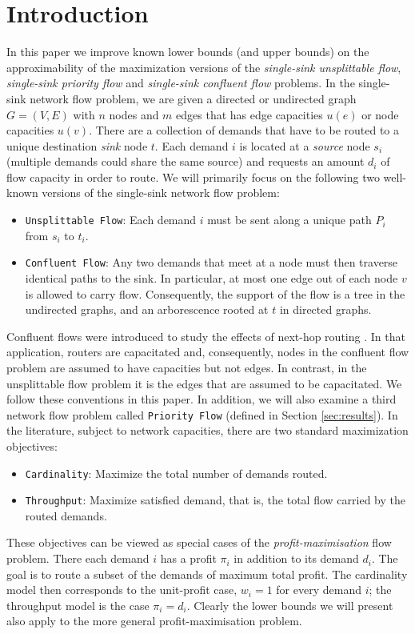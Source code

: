 \documentclass[12pt]{article}
\begin{document}
\section{Introduction}
In this paper we improve known lower bounds (and upper bounds) on the approximability
of the maximization versions of the {\em single-sink unsplittable flow}, {\em single-sink priority flow}
and {\em single-sink confluent flow} problems.
In the single-sink network flow problem, we are given
a directed or undirected graph $G=(V,E)$ with $n$ nodes and $m$ edges that has edge capacities $u(e)$ or
node capacities $u(v)$. There are a collection of demands
that have to be routed to a unique destination {\em sink} node $t$.
Each demand $i$ is located at a {\em source} node $s_i$ (multiple demands could share the same source)
and requests an amount $d_i$ of flow capacity in order to route.
We will primarily focus on the following two well-known versions of the single-sink network flow problem:
\begin{itemize}
\item {\tt Unsplittable Flow}: Each demand $i$ must be sent along a unique path $P_i$ from
$s_i$ to $t_i$.
\item {\tt Confluent Flow}: Any two demands that meet at a node must then traverse identical paths
to the sink.  In particular, at most one edge out of each node $v$ is allowed to carry flow.
Consequently, the support of the flow is a tree in the
undirected graphs, and an arborescence rooted at $t$ in directed graphs.
\end{itemize}
Confluent flows were introduced to study the effects of next-hop routing \cite{Chen05}.
In that application, routers are capacitated and, consequently, nodes
in the confluent flow problem are assumed to have capacities but not edges.
In contrast, in the unsplittable flow problem it is the edges that are assumed to
be capacitated. We follow these conventions in this paper.
In addition, we will also examine a third network flow problem called {\tt Priority Flow} (defined in Section \ref{sec:results}).
In the literature, subject to network capacities, there are two standard maximization objectives:



\begin{itemize}
\item {\tt Cardinality}: Maximize the total number of demands routed.
\item {\tt Throughput}: Maximize satisfied demand, that is, the total flow carried by the routed demands.
\end{itemize}
These objectives can be viewed as special cases of the
{\em profit-maximisation} flow problem. There each demand $i$ has
a profit $\pi_i$ in addition to its demand $d_i$. The goal is to route a subset
of the demands of maximum total profit. The cardinality model then corresponds to the
unit-profit case, $w_i=1$ for every demand $i$; the throughput model is the case $\pi_i=d_i$.
Clearly the lower bounds we will present also apply to the more general
profit-maximisation problem.
\end{document}
